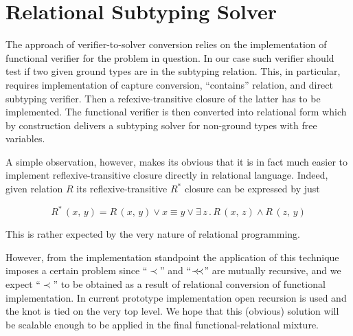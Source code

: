 \section{Relational Subtyping Solver}
\label{sec:solver}

The approach of verifier-to-solver conversion relies on the implementation of functional verifier for the problem in question. In our
case such verifier should test if two given ground types are in the subtyping relation. This, in particular, requires implementation
of capture conversion, ``contains'' relation, and direct subtyping verifier. Then a refexive-transitive closure of the latter has to
be implemented. The functional verifier is then converted into relational form which by construction delivers a subtyping solver for
non-ground types with free variables.

A simple observation, however, makes its obvious that it is in fact much easier to implement reflexive-transitive closure directly
in relational language. Indeed, given relation $R$ its reflexive-transitive $R^*$ closure can be expressed by just

\[
R^*\,(x,\, y) = R\, (x,\, y)\vee x\equiv y\vee\exists\, z\,.\,R\,(x,\,z)\wedge R\,(z,\,y)
\]

This is rather expected by the very nature of relational programming.

However, from the implementation standpoint the application of this technique imposes a certain problem since ``$\prec$'' and ``$\prec\mathrel{\mkern-5mu}\prec$''
are mutually recursive, and we expect ``$\prec$'' to be obtained as a result of relational conversion of functional implementation. In current
prototype implementation open recursion is used and the knot is tied on the very top level. We hope that this (obvious) solution will be
scalable enough to be applied in the final functional-relational mixture.
